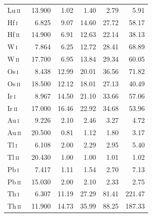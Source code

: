 \documentclass[traditabstract]{aa}
\newcommand{\altosi}{Os\,\textsc{i}}
\newcommand{\altosii}{Os\,\textsc{ii}}
\newcommand{\altiri}{Ir\,\textsc{i}}
\newcommand{\altirii}{Ir\,\textsc{ii}}
\newcommand{\altaui}{Au\,\textsc{i}}
\newcommand{\altauii}{Au\,\textsc{ii}}
\newcommand{\altpbi}{Pb\,\textsc{i}}
\newcommand{\altpbii}{Pb\,\textsc{ii}}
\newcommand{\altthi}{Th\,\textsc{i}}
\newcommand{\altthii}{Th\,\textsc{ii}}
\newcommand{\altwi}{W\,\textsc{i}}
\newcommand{\altwii}{W\,\textsc{ii}}
\newcommand{\althfi}{Hf\,\textsc{i}}
\newcommand{\althfii}{Hf\,\textsc{ii}}
\newcommand{\altluii}{Lu\,\textsc{ii}}
\newcommand{\alttli}{Tl\,\textsc{i}}
\newcommand{\alttlii}{Tl\,\textsc{ii}}
\newcommand{\osi}{\altosi\ }
\newcommand{\osii}{\altosii\ }
\newcommand{\iri}{\altiri\ }
\newcommand{\irii}{\altirii\ }
\newcommand{\aui}{\altaui\ }
\newcommand{\auii}{\altauii\ }
\newcommand{\pbi}{\altpbi\ }
\newcommand{\pbii}{\altpbii\ }
\newcommand{\thi}{\altthi\ }
\newcommand{\thii}{\altthii\ }
\newcommand{\wi}{\altwi\ }
\newcommand{\wii}{\altwii\ }
\newcommand{\hfi}{\althfi\ }
\newcommand{\hfii}{\althfii\ }
\newcommand{\luii}{\altluii\ }
\newcommand{\tli}{\alttli\ }
\newcommand{\tlii}{\alttlii\ }
\begin{document}
\begin{table}
\begin{minipage}{\columnwidth}
\begin{tabular}{l r r r r r}
  \luii &  13.900 &      1.02 &      1.40 &      2.79 &      5.91 \\
  \hfi  &   6.825 &      9.07 &     14.60 &     27.72 &     58.17 \\
  \hfii &  14.900 &      6.91 &     12.63 &     22.14 &     38.13 \\
  \wi   &   7.864 &      6.25 &     12.72 &     28.41 &     68.89 \\
  \wii  &  17.700 &      6.95 &     13.84 &     29.34 &     60.05 \\
  \osi  &   8.438 &     12.99 &     20.01 &     36.56 &     71.82 \\
  \osii &  18.500 &     12.12 &     18.01 &     27.13 &     40.49 \\
  \iri  &   8.967 &     14.50 &     21.10 &     33.66 &     57.06 \\
  \irii &  17.000 &     16.46 &     22.92 &     34.68 &     53.96 \\
  \aui  &   9.226 &      2.10 &      2.46 &      3.27 &      4.72 \\
  \auii &  20.500 &      0.81 &      1.12 &      1.80 &      3.17 \\
  \tli  &   6.108 &      2.00 &      2.29 &      2.95 &      5.40 \\
  \tlii &  20.430 &      1.00 &      1.00 &      1.01 &      1.02 \\
  \pbi  &   7.417 &      1.11 &      1.54 &      2.70 &      7.13 \\
  \pbii &  15.030 &      2.00 &      2.10 &      2.33 &      2.75 \\
  \thi  &   6.307 &     11.19 &     27.29 &     81.41 &    221.47 \\
  \thii &  11.900 &     14.73 &     35.99 &     88.25 &    187.33 \\
\hline
\end{tabular}
\end{minipage}
\end{table}
\end{document}
